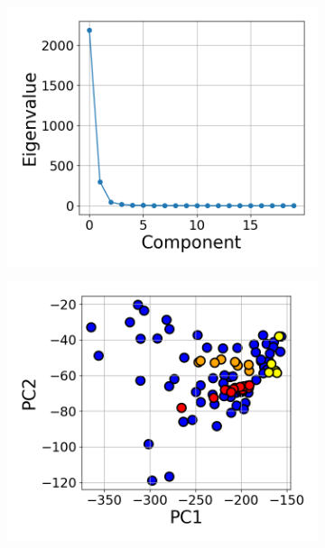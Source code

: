 \documentclass{article} %
\begin{document}
\begin{figure}[t]
\begin{subfigure}{0.08\textwidth}
{    }
\end{subfigure}
\vfill
\begin{subfigure}{0.182\textwidth}
    \includegraphics[width=\linewidth]{images/model-eigenvalue-decay.png}
    \caption{}
\end{subfigure}\hfill
\begin{subfigure}{0.182\textwidth}
    \includegraphics[width=\linewidth]{images/model-pca-components.png}
    \caption{}
\end{subfigure}\hfill
\begin{subfigure}{0.182\textwidth}

\end{subfigure}
\end{figure}
\end{document}
